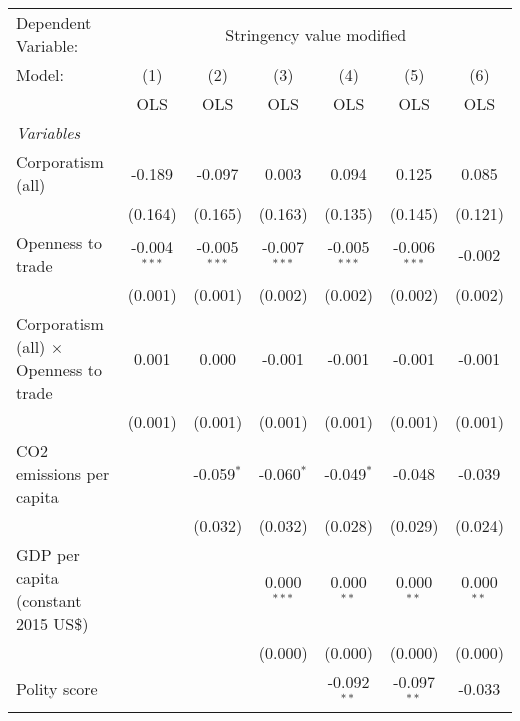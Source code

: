 
\begingroup
\centering
\begin{tabular}{lcccccc}
   \toprule
   Dependent Variable: & \multicolumn{6}{c}{Stringency value modified}\\
   Model:                                        & (1)            & (2)            & (3)            & (4)            & (5)            & (6)\\  
                                                 &  OLS           & OLS            & OLS            & OLS            & OLS            & OLS\\  
   \midrule
   \emph{Variables}\\
   Corporatism (all)                             & -0.189         & -0.097         & 0.003          & 0.094          & 0.125          & 0.085\\   
                                                 & (0.164)        & (0.165)        & (0.163)        & (0.135)        & (0.145)        & (0.121)\\   
   Openness to trade                             & -0.004$^{***}$ & -0.005$^{***}$ & -0.007$^{***}$ & -0.005$^{***}$ & -0.006$^{***}$ & -0.002\\   
                                                 & (0.001)        & (0.001)        & (0.002)        & (0.002)        & (0.002)        & (0.002)\\   
   Corporatism (all) $\times$ Openness to trade  & 0.001          & 0.000          & -0.001         & -0.001         & -0.001         & -0.001\\   
                                                 & (0.001)        & (0.001)        & (0.001)        & (0.001)        & (0.001)        & (0.001)\\   
   CO2 emissions per capita                      &                & -0.059$^{*}$   & -0.060$^{*}$   & -0.049$^{*}$   & -0.048         & -0.039\\   
                                                 &                & (0.032)        & (0.032)        & (0.028)        & (0.029)        & (0.024)\\   
   GDP per capita (constant 2015 US\$)           &                &                & 0.000$^{***}$  & 0.000$^{**}$   & 0.000$^{**}$   & 0.000$^{**}$\\   
                                                 &                &                & (0.000)        & (0.000)        & (0.000)        & (0.000)\\   
   Polity score                                  &                &                &                & -0.092$^{**}$  & -0.097$^{**}$  & -0.033\\   

\end{tabular}
